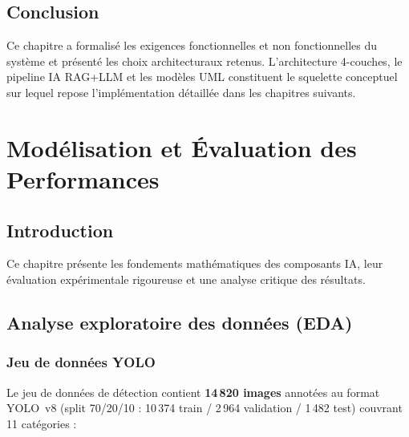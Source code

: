 \section*{Conclusion}
Ce chapitre a formalisé les exigences fonctionnelles et non fonctionnelles
du système et présenté les choix architecturaux retenus. L'architecture
4-couches, le pipeline IA RAG+LLM et les modèles UML constituent le
squelette conceptuel sur lequel repose l'implémentation détaillée dans les
chapitres suivants.

\chapter{Modélisation et Évaluation des Performances}
\section*{Introduction}
Ce chapitre présente les fondements mathématiques des composants IA,
leur évaluation expérimentale rigoureuse et une analyse critique des
résultats.

\section{Analyse exploratoire des données (EDA)}

\subsection{Jeu de données YOLO}
Le jeu de données de détection contient \textbf{14\,820 images} annotées au
format YOLO~v8 (split 70/20/10 : 10\,374 train / 2\,964 validation / 1\,482 test)
couvrant 11 catégories :

